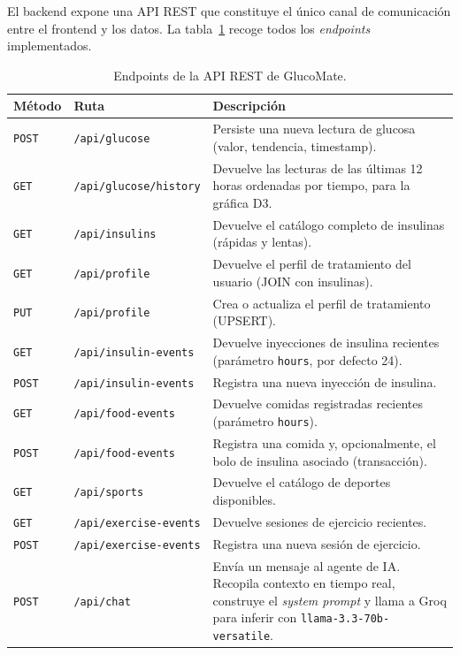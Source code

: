 El backend expone una API REST que constituye el único canal de comunicación entre
el frontend y los datos. La tabla~\ref{tab:api-endpoints} recoge todos los
\textit{endpoints} implementados.

\begin{table}[H]
\centering
\caption{Endpoints de la API REST de GlucoMate.}
\label{tab:api-endpoints}
\begin{tabular}{|l|l|p{7cm}|}
\hline
\textbf{Método} & \textbf{Ruta} & \textbf{Descripción} \\
\hline
\texttt{POST} & \texttt{/api/glucose}            & Persiste una nueva lectura de glucosa (valor, tendencia, timestamp). \\
\texttt{GET}  & \texttt{/api/glucose/history}    & Devuelve las lecturas de las últimas 12 horas ordenadas por tiempo, para la gráfica D3. \\
\hline
\texttt{GET}  & \texttt{/api/insulins}           & Devuelve el catálogo completo de insulinas (rápidas y lentas). \\
\texttt{GET}  & \texttt{/api/profile}            & Devuelve el perfil de tratamiento del usuario (JOIN con insulinas). \\
\texttt{PUT}  & \texttt{/api/profile}            & Crea o actualiza el perfil de tratamiento (UPSERT). \\
\hline
\texttt{GET}  & \texttt{/api/insulin-events}     & Devuelve inyecciones de insulina recientes (parámetro \texttt{hours}, por defecto 24). \\
\texttt{POST} & \texttt{/api/insulin-events}     & Registra una nueva inyección de insulina. \\
\hline
\texttt{GET}  & \texttt{/api/food-events}        & Devuelve comidas registradas recientes (parámetro \texttt{hours}). \\
\texttt{POST} & \texttt{/api/food-events}        & Registra una comida y, opcionalmente, el bolo de insulina asociado (transacción). \\
\hline
\texttt{GET}  & \texttt{/api/sports}             & Devuelve el catálogo de deportes disponibles. \\
\texttt{GET}  & \texttt{/api/exercise-events}    & Devuelve sesiones de ejercicio recientes. \\
\texttt{POST} & \texttt{/api/exercise-events}    & Registra una nueva sesión de ejercicio. \\
\hline
\texttt{POST} & \texttt{/api/chat}               & Envía un mensaje al agente de IA. Recopila contexto en tiempo real, construye el \textit{system prompt} y llama a Groq para inferir con \texttt{llama-3.3-70b-versatile}. \\
\hline
\end{tabular}
\end{table}


